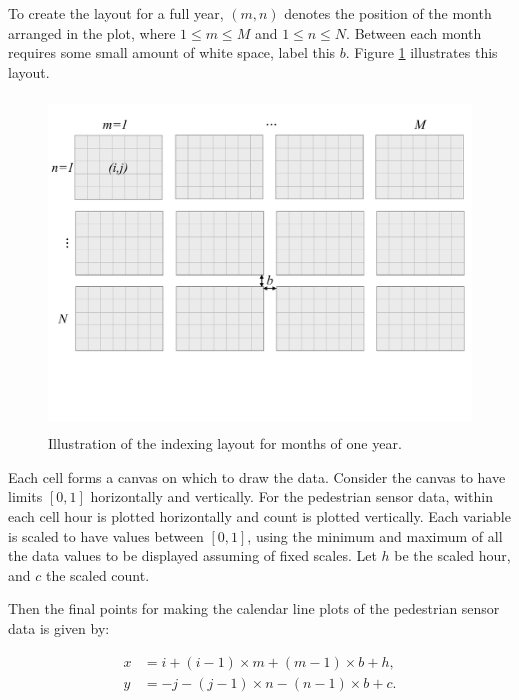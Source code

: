 \documentclass[article]{jss}
\begin{document}
To create the layout for a full year, \((m, n)\) denotes the position of
the month arranged in the plot, where \(1 \le m \le M\) and
\(1 \le n \le N\). Between each month requires some small amount of
white space, label this \(b\). Figure \ref{fig:year-diagram} illustrates
this layout.

\begin{CodeChunk}
\begin{figure}

{\centering \includegraphics[width=360pt,height=250pt]{figure/year} 

}

\caption[Illustration of the indexing layout for months of one year]{Illustration of the indexing layout for months of one year.}\label{fig:year-diagram}
\end{figure}
\end{CodeChunk}

Each cell forms a canvas on which to draw the data. Consider the canvas
to have limits \([0, 1]\) horizontally and vertically. For the
pedestrian sensor data, within each cell hour is plotted horizontally
and count is plotted vertically. Each variable is scaled to have values
between \([0,1]\), using the minimum and maximum of all the data values
to be displayed assuming of fixed scales. Let \(h\) be the scaled hour,
and \(c\) the scaled count.

Then the final points for making the calendar line plots of the
pedestrian sensor data is given by:

\begin{equation}
  \begin{aligned}
  x &= i + (i - 1) \times m + (m - 1) \times b + h, \\
  y &= -j - (j - 1) \times n - (n - 1) \times b + c. \label{eq:final}
  \end{aligned}
\end{equation}
\end{document}
